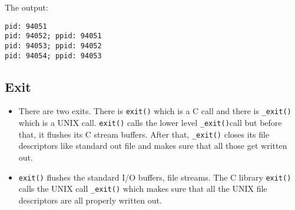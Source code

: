 \documentclass[]{article}
\newenvironment{Shaded}{}{}
\newcommand{\DataTypeTok}[1]{\textcolor[rgb]{0.56,0.13,0.00}{#1}}
\newcommand{\DecValTok}[1]{\textcolor[rgb]{0.25,0.63,0.44}{#1}}
\newcommand{\SpecialCharTok}[1]{\textcolor[rgb]{0.25,0.44,0.63}{#1}}
\newcommand{\StringTok}[1]{\textcolor[rgb]{0.25,0.44,0.63}{#1}}
\newcommand{\CommentTok}[1]{\textcolor[rgb]{0.38,0.63,0.69}{\textit{#1}}}
\newcommand{\ControlFlowTok}[1]{\textcolor[rgb]{0.00,0.44,0.13}{\textbf{#1}}}
\newcommand{\NormalTok}[1]{#1}
\begin{document}
\begin{itemize}
\begin{Shaded}
\end{Shaded}

  The output:

\begin{verbatim}
pid: 94051
pid: 94052; ppid: 94051
pid: 94053; ppid: 94052
pid: 94054; ppid: 94053
\end{verbatim}
\end{itemize}

\subsection{\texorpdfstring{\textbf{Exit}}{Exit}}\label{header-n225}

\begin{itemize}
\item
  There are two exits. There is \texttt{exit()} which is a C call and
  there is \texttt{\_exit()} which is a UNIX call. \texttt{exit()} calls
  the lower level \texttt{\_exit()}call but before that, it flushes its
  C stream buffers. After that, \texttt{\_exit()} closes its file
  descriptors like standard out file and makes sure that all those get
  written out.
\item
  \texttt{exit()} flushes the standard I/O buffers, file streams. The C
  library \texttt{exit()} calls the UNIX call \texttt{\_exit()} which
  makes sure that all the UNIX file descriptors are all properly written
  out.
\end{itemize}
\end{document}
